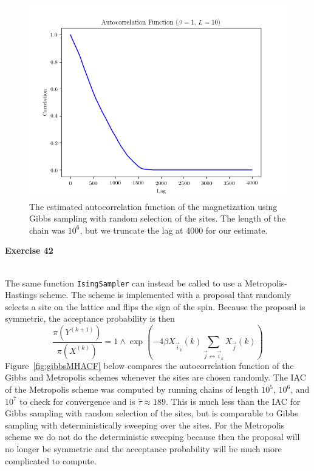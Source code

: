 \documentclass[11pt,a4paper]{amsart}
\begin{document}
\begin{figure}[H]
\centering
\includegraphics[width=5in]{ACFb.png}
\caption{The estimated autocorrelation function of the magnetization using Gibbs sampling with random selection of the sites.  The length of the chain was $10^6$, but we truncate the lag at 4000 for our estimate.}
\label{fig:ACFb}
\end{figure}









{\bf Exercise 42}\\
\\
\par The same function {\tt IsingSampler} can instead be called to use a Metropolis-Hastings scheme.  The scheme is implemented with a proposal that randomly selects a site on the lattice and flips the sign of the spin.  Because the proposal is symmetric, the acceptance probability is then
\[
\frac{\pi(Y^{(k+1)})}{\pi(X^{(k)})} = 1 \wedge \exp \left( -4\beta X_{\vec{i}_k}(k) \sum_{\vec{j} \leftrightarrow \vec{i}_k} X_{\vec{j}}(k) \right)
\]
Figure~\ref{fig:gibbsMHACF} below compares the autocorrelation function of the Gibbs and Metropolis schemes whenever the sites are chosen randomly.  The IAC of the Metropolis scheme was computed by running chains of length $10^5$, $10^6$, and $10^7$ to check for convergence and is $\hat{\tau} \approx 189$.  This is much less than the IAC for Gibbs sampling with random selection of the sites, but is comparable to Gibbs sampling with deterministically sweeping over the sites.  For the Metropolis scheme we do not do the deterministic sweeping because then the proposal will no longer be symmetric and the acceptance probability will be much more complicated to compute.
\end{document}
